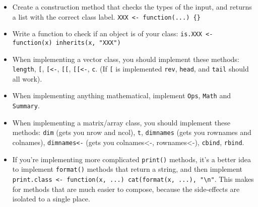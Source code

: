 \begin{itemize}
\item
  Create a construction method that checks the types of the input, and
  returns a list with the correct class label.
  \texttt{XXX \textless{}- function(...) \{\}}
\item
  Write a function to check if an object is of your class:
  \texttt{is.XXX \textless{}-   function(x) inherits(x, "XXX")}
\item
  When implementing a vector class, you should implement these methods:
  \texttt{length}, \texttt{{[}}, \texttt{{[}\textless{}-},
  \texttt{{[}{[}}, \texttt{{[}{[}\textless{}-}, \texttt{c}. (If
  \texttt{{[}} is implemented \texttt{rev}, \texttt{head}, and
  \texttt{tail} should all work).
\item
  When implementing anything mathematical, implement \texttt{Ops},
  \texttt{Math} and \texttt{Summary}.
\item
  When implementing a matrix/array class, you should implement these
  methods: \texttt{dim} (gets you nrow and ncol), \texttt{t},
  \texttt{dimnames} (gets you rownames and colnames),
  \texttt{dimnames\textless{}-} (gets you colnames\textless{}-,
  rownames\textless{}-), \texttt{cbind}, \texttt{rbind}.
\item
  If you're implementing more complicated \texttt{print()} methods, it's
  a better idea to implement \texttt{format()} methods that return a
  string, and then implement
  \texttt{print.class \textless{}- function(x, ...) cat(format(x, ...), "\textbackslash{}n"}.
  This makes for methods that are much easier to compose, because the
  side-effects are isolated to a single place.
\end{itemize}
